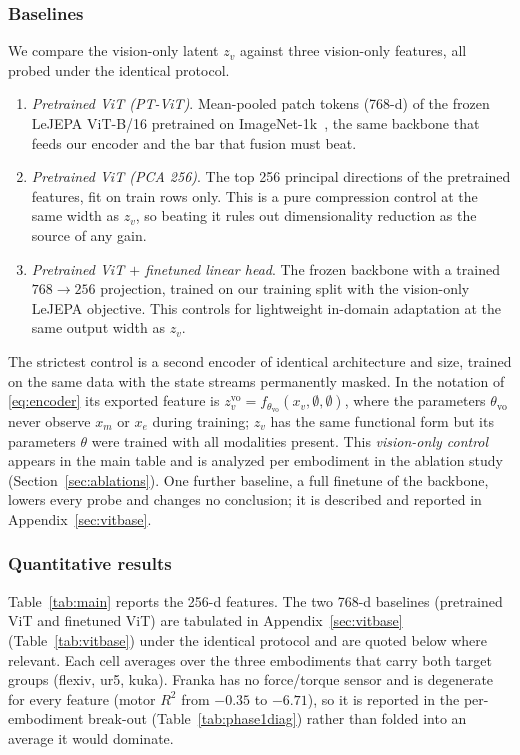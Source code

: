 \documentclass{article}
\begin{document}
\subsubsection{Baselines}
\label{sec:baselines}
We compare the vision-only latent $z_v$ against three vision-only features, all probed under the identical protocol.
\begin{enumerate}
  \item \emph{Pretrained ViT (PT-ViT)}. Mean-pooled patch tokens (768-d) of the frozen LeJEPA ViT-B/16 pretrained on ImageNet-1k~\citep{lejepa2025}, the same backbone that feeds our encoder and the bar that fusion must beat.
  \item \emph{Pretrained ViT (PCA 256)}. The top 256 principal directions of the pretrained features, fit on train rows only. This is a pure compression control at the same width as $z_v$, so beating it rules out dimensionality reduction as the source of any gain.
  \item \emph{Pretrained ViT $+$ finetuned linear head}. The frozen backbone with a trained $768\!\rightarrow\!256$ projection, trained on our training split with the vision-only LeJEPA objective. This controls for lightweight in-domain adaptation at the same output width as $z_v$.
\end{enumerate}
The strictest control is a second encoder of identical architecture and size, trained on the same data with the state streams permanently masked. In the notation of \eqref{eq:encoder} its exported feature is $z_v^{\mathrm{vo}} = f_{\theta_{\mathrm{vo}}}(x_v, \emptyset, \emptyset)$, where the parameters $\theta_{\mathrm{vo}}$ never observe $x_m$ or $x_e$ during training; $z_v$ has the same functional form but its parameters $\theta$ were trained with all modalities present. This \emph{vision-only control} appears in the main table and is analyzed per embodiment in the ablation study (Section~\ref{sec:ablations}). One further baseline, a full finetune of the backbone, lowers every probe and changes no conclusion; it is described and reported in Appendix~\ref{sec:vitbase}.

\subsubsection{Quantitative results}
\label{sec:mainresults}
Table~\ref{tab:main} reports the 256-d features. The two 768-d baselines (pretrained ViT and finetuned ViT) are tabulated in Appendix~\ref{sec:vitbase} (Table~\ref{tab:vitbase}) under the identical protocol and are quoted below where relevant. Each cell averages over the three embodiments that carry both target groups (flexiv, ur5, kuka). Franka has no force/torque sensor and is degenerate for every feature (motor $R^2$ from $-0.35$ to $-6.71$), so it is reported in the per-embodiment break-out (Table~\ref{tab:phase1diag}) rather than folded into an average it would dominate.
\end{document}
